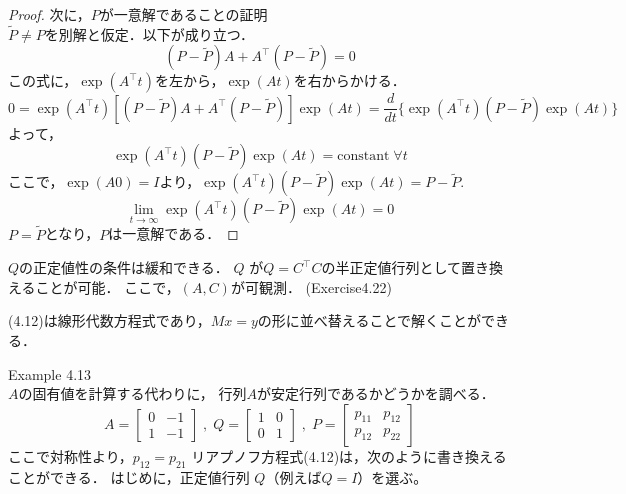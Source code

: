 \documentclass{jsarticle}
\begin{document}
\begin{proof}
  次に，$P$が一意解であることの証明\\
  $\tilde{P}\neq P$を別解と仮定．以下が成り立つ．
  \begin{equation*}
    (P-\tilde{P})A + A^\top (P-\tilde{P}) = 0
  \end{equation*}
  この式に，$\exp(A^\top t)$を左から，$\exp(At)$を右からかける．
  \begin{equation*}
    0 = \exp(A^\top t)[(P-\tilde{P})A + A^\top (P-\tilde{P})]\exp(At) = \frac{d}{dt}\{\exp(A^\top t)(P-\tilde{P})\exp(At)\}
  \end{equation*}
  よって，
  \begin{equation*}
    \exp(A^\top t)(P-\tilde{P})\exp(At) = \text{constant} \;\forall t
  \end{equation*}
  ここで，$\exp(A0)=I$より，$\exp(A^\top t)(P-\tilde{P})\exp(At)=P-\tilde{P}$.
  \begin{equation*}
    \lim_{t\rightarrow \infty} \exp(A^\top t)(P-\tilde{P})\exp(At) = 0
  \end{equation*}
  $P = \tilde{P}$となり，$P$は一意解である．
\end{proof}
$Q$の正定値性の条件は緩和できる．
$Q$ が$Q = C^\top C$の半正定値行列として置き換えることが可能．
ここで，$(A, C)$が可観測． (Exercise4.22)

{\color{gray}\hrulefill}

(4.12)は線形代数方程式であり，$Mx = y$の形に並べ替えることで解くことができる．


Example 4.13\\
$A$の固有値を計算する代わりに，
行列$A$が安定行列であるかどうかを調べる．
\begin{equation*}
  A = \left[
    \begin{matrix}
      0&-1\\1&-1
    \end{matrix}
  \right]\;,\;
  Q = \left[
    \begin{matrix}
      1&0\\0&1
    \end{matrix}
  \right]\;,\;
  P = \left[
    \begin{matrix}
      p_{11} & p_{12}\\
      p_{12} & p_{22}
    \end{matrix}
  \right] 
\end{equation*}
ここで対称性より，$p_{12}=p_{21}$
リアプノフ方程式(4.12)は，次のように書き換えることができる．
はじめに，正定値行列 $Q$（例えば$Q = I$）を選ぶ。
\end{document}
